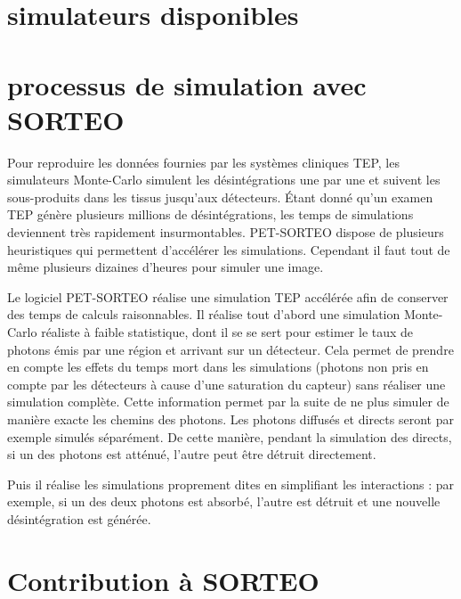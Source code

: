 	\section{simulateurs disponibles}



	\section{processus de simulation avec SORTEO}

Pour reproduire les données fournies par les systèmes cliniques TEP, les simulateurs Monte-Carlo simulent les désintégrations une par une et suivent les sous-produits dans les tissus jusqu'aux détecteurs. Étant donné qu'un examen TEP génère plusieurs millions de désintégrations, les temps de simulations deviennent très rapidement insurmontables. PET-SORTEO dispose de plusieurs heuristiques qui permettent d'accélérer les simulations. Cependant il faut tout de même plusieurs dizaines d'heures pour simuler une image.

Le logiciel PET-SORTEO réalise une simulation TEP accélérée afin de conserver des temps de calculs raisonnables. Il réalise tout d'abord une simulation Monte-Carlo réaliste à faible statistique, dont il se se sert pour estimer le taux de photons émis par une région et arrivant sur un détecteur. Cela permet de prendre en compte les effets du temps mort dans les simulations (photons non pris en compte par les détecteurs à cause d'une saturation du capteur) sans réaliser une simulation complète. Cette information permet par la suite de ne plus simuler de manière exacte les chemins des photons. Les photons diffusés et directs seront par exemple simulés séparément. De cette manière, pendant la simulation des directs, si un des photons est atténué, l'autre peut être détruit directement.

Puis il réalise les simulations proprement dites en simplifiant les interactions : par exemple, si un des deux photons est absorbé, l'autre est détruit et une nouvelle désintégration est générée.

	\section{Contribution à SORTEO}

